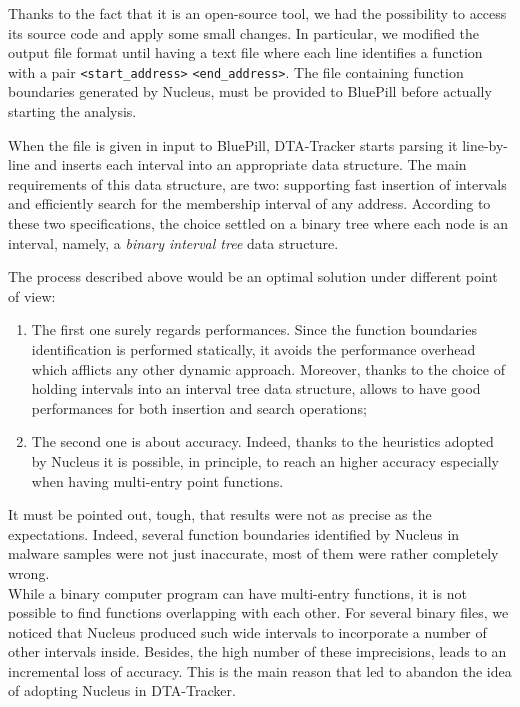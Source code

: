 \documentclass[LaM,binding=0.6cm]{sapthesis}
\begin{document}
Thanks to the fact that it is an open-source tool, we had the possibility to access its source code and apply some small changes. In particular, we modified the output file format until having a text file where each line identifies a function with a pair \texttt{<start\_address>} \texttt{<end\_address>}. The file containing function boundaries generated by Nucleus, must be provided to BluePill before actually starting the analysis.

When the file is given in input to BluePill, {\sf DTA-Tracker} starts parsing it line-by-line and inserts each interval into an appropriate data structure. The main requirements of this data structure, are two: supporting fast insertion of intervals and efficiently search for the membership interval of any address. According to these two specifications, the choice settled on a binary tree where each node is an interval, namely, a \textit{binary interval tree} data structure.

The process described above would be an optimal solution under different point of view:
\begin{enumerate}
\item The first one surely regards performances. Since the function boundaries identification is performed statically, it avoids the performance overhead which afflicts any other dynamic approach. Moreover, thanks to the choice of holding intervals into an interval tree data structure, allows to have good performances for both insertion and search operations;
\item The second one is about accuracy. Indeed, thanks to the heuristics adopted by Nucleus it is possible, in principle, to reach an higher accuracy especially when having multi-entry point functions.
\end{enumerate}
It must be pointed out, tough, that results were not as precise as the expectations. Indeed, several function boundaries identified by Nucleus in  malware samples were not just inaccurate, most of them were rather completely wrong.\\

While a binary computer program can have multi-entry functions, it is not possible to find functions overlapping with each other. For several binary files, we noticed that Nucleus produced such wide intervals to incorporate a number of other intervals inside. Besides, the high number of these imprecisions, leads to an incremental loss of accuracy. This is the main reason that led to abandon the idea of adopting Nucleus in {\sf DTA-Tracker}.
\end{document}
